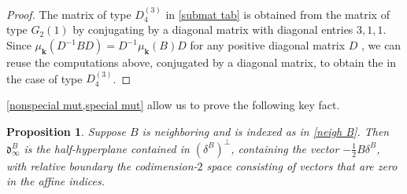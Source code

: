 \documentclass{amsart}
\newtheorem{proposition}{Proposition}[section]
\theoremstyle{definition}
\theoremstyle{remark}
\numberwithin{equation}{section}
\newcommand{\0}{{\mathbf{0}}}
\newcommand{\kk}{\mathbf{k}}
\renewcommand{\d}{{\mathfrak d}}
\begin{document}
\begin{proof}
The matrix of type $D_4^{(3)}$ in \cref{submat tab} is obtained from the matrix of type $G_2{(1)}$ by conjugating by a diagonal matrix with diagonal entries $3,1,1$.
Since $\mu_\kk(D^{-1}BD)=D^{-1}\mu_\kk(B)D$ for any positive diagonal matrix $D$ \cite[Proposition~4.5]{ca1}, we can reuse the computations above, conjugated by a diagonal matrix, to obtain the  in the case of type $D_4^{(3)}$.
\end{proof}

\cref{nonspecial mut,special mut} allow us to prove the following key fact.

\begin{proposition}\label{neigh im wall}
Suppose $B$ is neighboring and is indexed as in \cref{neigh B}.
Then $\d^B_\infty$ is the half-hyperplane contained in $(\delta^B)^\perp$, containing the vector $-\frac12B\delta^B$, with relative boundary the codimension-$2$ space consisting of vectors that are zero in the affine indices.
\end{proposition}
\end{document}
